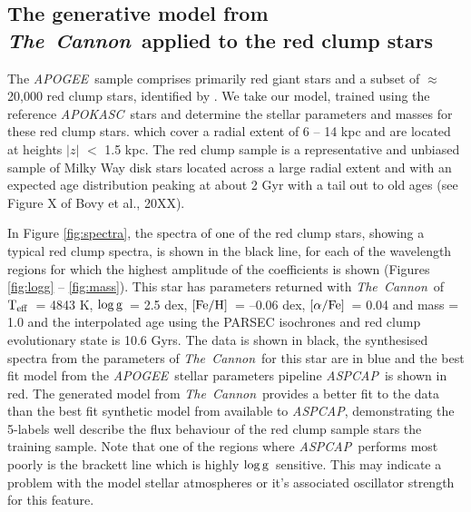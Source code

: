 \documentclass[12pt, preprint]{aastex}
\newcommand{\project}[1]{\textsl{#1}}
\newcommand{\tc}{\project{The~Cannon}}
\newcommand{\apogee}{\project{APOGEE}}
\newcommand{\apokasc}{\project{APOKASC}}
\newcommand{\aspcap}{\project{ASPCAP}}
\newcommand{\teff}{\mbox{$\rm T_{eff}$}}
\newcommand{\feh}{\mbox{$\rm [Fe/H]$}}
\newcommand{\alphafe}{\mbox{$\rm [\alpha/Fe]$}}
\newcommand{\logg}{\mbox{$\rm \log g$}}
\begin{document}
\subsection{The generative model from \tc\ applied to the red clump stars}

The \apogee\ sample comprises primarily red giant stars and a subset of  $\approx$ 20,000 red clump stars, identified by \citet{Bovy2014}. We take our model, trained using the reference \apokasc\ stars and determine the stellar parameters and masses for these red clump stars. which cover a radial extent of 6 -- 14 kpc and are located at heights $|z|$ $<$ 1.5 kpc. The red clump sample is a representative and unbiased sample of Milky Way disk stars located across a large radial extent and with an expected age distribution peaking at about 2 Gyr with a tail out to old ages (see Figure X of Bovy et al., 20XX). 

In Figure \ref{fig:spectra}, the spectra of one of the red clump stars, showing a typical red clump spectra, is shown in the black line, for each of the wavelength regions for which the highest amplitude of the coefficients is shown (Figures \ref{fig:logg} -- \ref{fig:mass}).  This star has parameters returned with \tc\ of \teff\ = 4843 K, \logg\ = 2.5 dex, \feh\ = --0.06 dex, \alphafe\ = 0.04 and mass = 1.0 and the interpolated age using the PARSEC isochrones and red clump evolutionary state is 10.6 Gyrs. The data is shown in black, the synthesised spectra from the parameters of \tc\ for this star are in blue and the best fit model from the \apogee\ stellar parameters pipeline \aspcap\ is shown in red. The generated model from \tc\ provides a better fit to the data than the best fit synthetic model from available to \aspcap, demonstrating the 5-labels well describe the flux behaviour of the red clump sample stars the training sample. Note that one of the regions where \aspcap\ performs most poorly is the brackett line which is highly \logg\ sensitive. This may indicate a problem with the model stellar atmospheres or it's associated oscillator strength for this feature. 

\end{document}
